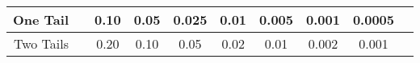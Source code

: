 \begin{table}[H]
\begin{center}
{{\begin{tabular}{|r|c|c|c|c|c|c|c|c|c|}
\hline One Tail& & 0.10 & 0.05 & 0.025 & 0.01 & 0.005 & 0.001 & 0.0005 &\\ 
\hline Two Tails& & 0.20 &   0.10 &   0.05 &   0.02  &  0.01  &  0.002 & 0.001 & \\ 
\hline 
\end{tabular} } }
\end{center}
\end{table}

\cleardoublepage